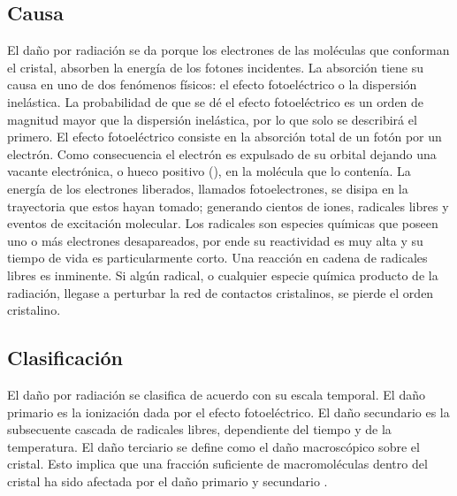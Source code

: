 \subsection{Causa}
El daño por radiación se da porque los electrones de las moléculas que conforman el cristal, absorben la energía de los fotones incidentes. La absorción tiene su causa en uno de dos fenómenos físicos: el efecto fotoeléctrico o la dispersión inelástica. La probabilidad de que se dé el efecto fotoeléctrico es un orden de magnitud mayor que la dispersión inelástica, por lo que solo se describirá el primero. El efecto fotoeléctrico consiste en la absorción total de un fotón por un electrón. Como consecuencia el electrón es expulsado de su orbital dejando una vacante electrónica, o hueco positivo (), en la molécula que lo contenía. La energía de los electrones liberados, llamados fotoelectrones, se disipa en la trayectoria que estos hayan tomado; generando cientos de iones, radicales libres y eventos de excitación molecular. Los radicales son especies químicas que poseen uno o más electrones desapareados, por ende su reactividad es muy alta y su tiempo de vida es particularmente corto. Una reacción en cadena de radicales libres es inminente. Si algún radical, o cualquier especie química producto de la radiación, llegase a perturbar la red de contactos cristalinos, se pierde el orden cristalino. 
\subsection{Clasificación}
El daño por radiación se clasifica de acuerdo con su escala temporal. El daño primario es la ionización dada por el efecto fotoeléctrico. El daño secundario es la subsecuente cascada de radicales libres, dependiente del tiempo y de la temperatura. El daño terciario se define como el daño macroscópico sobre el cristal. Esto implica que una fracción suficiente de macromoléculas dentro del cristal ha sido afectada por el daño primario y secundario .
